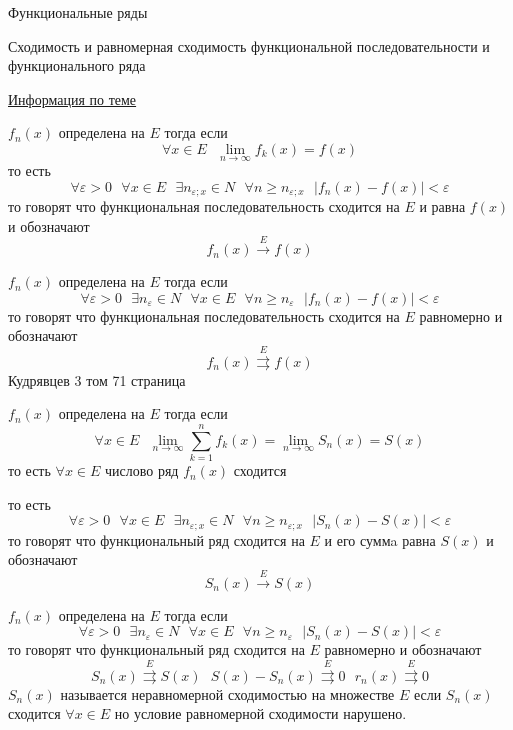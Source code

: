\begin{title}
  Функциональные ряды
\end{title}

\begin{title}[\Large]
  Сходимость и равномерная сходимость функциональной последовательности и
  функционального ряда
\end{title}

\href{http://nuclphys.sinp.msu.ru/mathan/p3/m3102.html}{Информация по теме}

\begin{define}
  $f_n(x)$ определена на $E$ тогда если
  $$
  \forall x \in E ~~~ \lim_{n \to \infty} f_k(x) = f(x)
  $$
  то есть
  $$
  \forall \varepsilon > 0 ~~~ \forall x \in E ~~~ \exists n_{\varepsilon; x}
  \in N ~~~ \forall n \ge n_{\varepsilon; x} ~~~ \left| f_n(x) - f(x) \right|
  < \varepsilon
  $$
  то говорят что функциональная последовательность сходится на $E$ и равна
  $f(x)$ и обозначают
  $$
  f_n(x) \stackrel{E}{\to} f(x)
  $$
\end{define}

\begin{define}
  $f_n(x)$ определена на $E$ тогда если
  $$
  \forall \varepsilon > 0 ~~~ \exists n_{\varepsilon} \in N ~~~ \forall x \in E
  ~~~ \forall n \ge n_{\varepsilon} ~~~ |f_n (x) - f(x)| < \varepsilon
  $$
  то говорят что функциональная последовательность сходится на $E$ равномерно и
  обозначают
  $$
  f_n(x) \stackrel{E}{\rightrightarrows} f(x)
  $$
  Кудрявцев 3 том 71 страница
\end{define}

\begin{define}
  $f_n(x)$ определена на $E$ тогда если
  $$
  \forall x \in E ~~~ \lim_{n \to \infty} \sum_{k=1}^n f_k(x) =
  \lim_{n \to \infty} S_n(x) = S(x)
  $$
  то есть $\forall x \in E$ числово ряд $f_n(x)$
  сходится

  то есть
  $$
  \forall \varepsilon > 0 ~~~ \forall x \in E ~~~ \exists n_{\varepsilon; x}
  \in N ~~~ \forall n \ge n_{\varepsilon; x} ~~~ \left| S_n(x) - S(x) \right|
  < \varepsilon
  $$
  то говорят что функциональный ряд сходится на $E$ и его суммa равна $S(x)$ и
  обозначают
  $$
  S_n(x) \stackrel{E}{\to} S(x)
  $$
\end{define}

\begin{define}
  $f_n(x)$ определена на $E$ тогда если
  $$
  \forall \varepsilon > 0 ~~~ \exists n_{\varepsilon} \in N ~~~ \forall x \in E
  ~~~ \forall n \ge n_{\varepsilon} ~~~ |S_n (x) - S(x)| < \varepsilon
  $$
  то говорят что функциональный ряд сходится на $E$ равномерно и обозначают
  $$
  S_n(x) \stackrel{E}{\rightrightarrows} S(x) ~~~
  S(x) - S_n(x) \stackrel{E}{\rightrightarrows} 0 ~~~
  r_n(x) \stackrel{E}{\rightrightarrows} 0
  $$
  $S_n(x)$ называется неравномерной сходимостью на множестве $E$ если $S_n(x)$
  сходится $\forall x \in E$ но условие равномерной сходимости нарушено.
\end{define}

